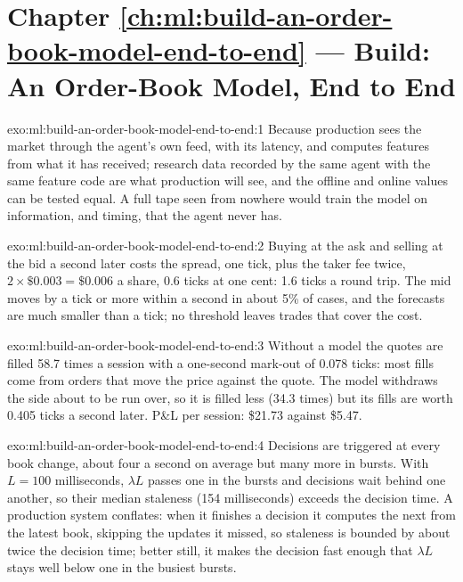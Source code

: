 \section*{Chapter \ref{ch:ml:build-an-order-book-model-end-to-end} --- Build: An Order-Book Model, End to End}

\begin{solution}{exo:ml:build-an-order-book-model-end-to-end:1}
Because production sees the market through the agent's own feed, with its latency, and computes features from what it has
received; research data recorded by the same agent with the same feature code are what production will see, and the offline and
online values can be tested equal. A full tape seen from nowhere would train the model on information, and timing, that the agent
never has.
\end{solution}

\begin{solution}{exo:ml:build-an-order-book-model-end-to-end:2}
Buying at the ask and selling at the bid a second later costs the spread, one tick, plus the taker fee twice, $2\times\$0.003=\$0.006$
a share, 0.6 ticks at one cent: 1.6 ticks a round trip. The mid moves by a tick or more within a second in about 5\% of cases, and
the forecasts are much smaller than a tick; no threshold leaves trades that cover the cost.
\end{solution}

\begin{solution}{exo:ml:build-an-order-book-model-end-to-end:3}
Without a model the quotes are filled 58.7 times a session with a one-second mark-out of 0.078 ticks: most fills come from orders
that move the price against the quote. The model withdraws the side about to be run over, so it is filled less (34.3 times) but
its fills are worth 0.405 ticks a second later. P\&L per session: \$21.73 against \$5.47.
\end{solution}

\begin{solution}{exo:ml:build-an-order-book-model-end-to-end:4}
Decisions are triggered at every book change, about four a second on average but many more in bursts. With $L=100$ milliseconds,
$\lambda L$ passes one in the bursts and decisions wait behind one another, so their median staleness (154 milliseconds) exceeds
the decision time. A production system conflates: when it finishes a decision it computes the next from the latest book, skipping
the updates it missed, so staleness is bounded by about twice the decision time; better still, it makes the decision fast enough
that $\lambda L$ stays well below one in the busiest bursts.
\end{solution}

